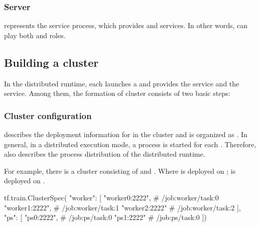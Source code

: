 \begin{content}
\subsubsection{Server}
 represents the  service process, which provides  and  services. In other words,  can play both  and  roles.


\subsection{Building a cluster}
In the distributed \tf{} runtime, each  launches a  and provides the  service and the  service. Among them, the formation of  cluster consists of two basic steps:

\begin{enum}
\end{enum}


\subsubsection{Cluster configuration}
 describes the deployment information for  in the cluster and is organized as . In general, in a distributed execution mode, a process is started for each . Therefore,  also describes the process distribution of the  distributed runtime.

For example, there is a  cluster consisting of  and . Where  is deployed on ;  is deployed on .

\begin{leftbar}
\begin{python}
tf.train.ClusterSpec({
  "worker": [
    "worker0:2222",   # /job:worker/task:0
    "worker1:2222",   # /job:worker/task:1
    "worker2:2222"    # /job:worker/task:2
  ],  
  "ps": [
    "ps0:2222",       # /job:ps/task:0
    "ps1:2222"        # /job:ps/task:0
  ]})
\end{python}
\end{leftbar}


\end{content}
